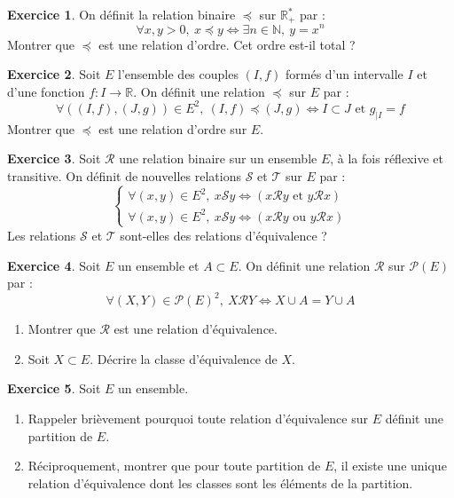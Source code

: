 \documentclass[french]{book}
\newcommand{\N}{\mathbb{N}}
\newcommand{\R}{\mathbb{R}}
\newcommand{\st}{^*}
\theoremstyle{definition}
\newtheorem{ex}{Exercice}[chapter]
\theoremstyle{theorem}
\theoremstyle{remark}
\begin{document}
\begin{ex}
	On définit la relation binaire $\preceq$ sur $\R_+\st$ par : $$\forall x,y>0,\ x\preceq y\iff\exists n\in\N,\ y=x^n$$ Montrer que $\preceq$ est une relation d'ordre. Cet ordre est-il total ?
\end{ex}

\begin{ex}
	Soit $E$ l'ensemble des couples $(I,f)$ formés d'un intervalle $I$ et d'une fonction $f:I\to\R$. On définit une relation $\preceq$ sur $E$ par : $$\forall \left((I,f),(J,g)\right)\in E^2,\ (I,f)\preceq(J,g)\iff I\subset J\text{ et }g_{\mid I}=f$$ Montrer que $\preceq$ est une relation d'ordre sur $E$.
\end{ex}

\begin{ex}
	Soit $\mathcal{R}$ une relation binaire sur un ensemble $E$, à la fois réflexive et transitive. On définit de nouvelles relations $\mathcal{S}$ et $\mathcal{T}$ sur $E$ par : 
	$$\begin{cases}
		\forall (x,y)\in E^2,\ x\mathcal{S}y\iff(x\mathcal{R}y\text{ et }y\mathcal{R}x) \\
		\forall (x,y)\in E^2,\ x\mathcal{S}y\iff(x\mathcal{R}y\text{ ou }y\mathcal{R}x)
	\end{cases}$$ Les relations $\mathcal{S}$ et $\mathcal{T}$ sont-elles des relations d'équivalence ?
\end{ex}

\begin{ex}
	Soit $E$ un ensemble et $A\subset E$. On définit une relation $\mathcal{R}$ sur $\mathcal{P}(E)$ par : $$\forall (X,Y)\in\mathcal{P}(E)^2,\ X\mathcal{R}Y\iff X\cup A=Y\cup A$$
	\begin{enumerate}
		\item Montrer que $\mathcal{R}$ est une relation d'équivalence.
		\item Soit $X\subset E$. Décrire la classe d'équivalence de $X$.
	\end{enumerate}
\end{ex}

\begin{ex}
	Soit $E$ un ensemble.
	\begin{enumerate}
		\item Rappeler brièvement pourquoi toute relation d'équivalence sur $E$ définit une partition de $E$.
		\item Réciproquement, montrer que pour toute partition de $E$, il existe une unique relation d'équivalence dont les classes sont les éléments de la partition.
	\end{enumerate}
\end{ex}
\end{document}
